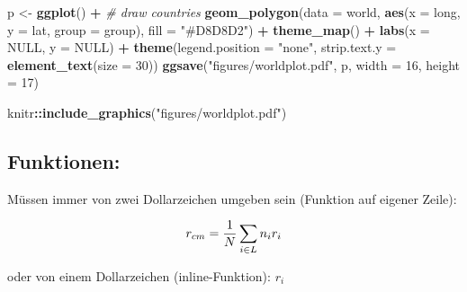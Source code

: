 \documentclass[
  11pt,
]{article}
\newenvironment{Shaded}{\begin{snugshade}}{\end{snugshade}}
\newcommand{\CommentTok}[1]{\textcolor[rgb]{0.56,0.35,0.01}{\textit{#1}}}
\newcommand{\DataTypeTok}[1]{\textcolor[rgb]{0.13,0.29,0.53}{#1}}
\newcommand{\DecValTok}[1]{\textcolor[rgb]{0.00,0.00,0.81}{#1}}
\newcommand{\KeywordTok}[1]{\textcolor[rgb]{0.13,0.29,0.53}{\textbf{#1}}}
\newcommand{\NormalTok}[1]{#1}
\newcommand{\OperatorTok}[1]{\textcolor[rgb]{0.81,0.36,0.00}{\textbf{#1}}}
\newcommand{\OtherTok}[1]{\textcolor[rgb]{0.56,0.35,0.01}{#1}}
\newcommand{\StringTok}[1]{\textcolor[rgb]{0.31,0.60,0.02}{#1}}
\begin{document}
\small

\linespread{1}

\begin{Shaded}
\begin{Highlighting}[]
\NormalTok{p \textless{}{-}}\StringTok{ }\KeywordTok{ggplot}\NormalTok{() }\OperatorTok{+}\StringTok{ }
\StringTok{  }\CommentTok{\# draw countries}
\StringTok{  }\KeywordTok{geom\_polygon}\NormalTok{(}\DataTypeTok{data =}\NormalTok{ world, }\KeywordTok{aes}\NormalTok{(}\DataTypeTok{x =}\NormalTok{ long, }
                                       \DataTypeTok{y =}\NormalTok{ lat, }
                                       \DataTypeTok{group =}\NormalTok{ group), }
                 \DataTypeTok{fill =} \StringTok{"\#D8D8D2"}\NormalTok{) }\OperatorTok{+}
\StringTok{  }\KeywordTok{theme\_map}\NormalTok{() }\OperatorTok{+}
\StringTok{  }\KeywordTok{labs}\NormalTok{(}\DataTypeTok{x =} \OtherTok{NULL}\NormalTok{,}
       \DataTypeTok{y =} \OtherTok{NULL}\NormalTok{) }\OperatorTok{+}
\StringTok{  }\KeywordTok{theme}\NormalTok{(}\DataTypeTok{legend.position =} \StringTok{"none"}\NormalTok{,}
        \DataTypeTok{strip.text.y =} \KeywordTok{element\_text}\NormalTok{(}\DataTypeTok{size =} \DecValTok{30}\NormalTok{))}
\KeywordTok{ggsave}\NormalTok{(}\StringTok{"figures/worldplot.pdf"}\NormalTok{, p, }\DataTypeTok{width =} \DecValTok{16}\NormalTok{, }\DataTypeTok{height =} \DecValTok{17}\NormalTok{)}
\end{Highlighting}
\end{Shaded}

\linespread{1.5}

\normalsize

\small

\linespread{1}

\begin{Shaded}
\begin{Highlighting}[]
\NormalTok{knitr}\OperatorTok{::}\KeywordTok{include\_graphics}\NormalTok{(}\StringTok{"figures/worldplot.pdf"}\NormalTok{)}
\end{Highlighting}
\end{Shaded}

\linespread{1.5}

\normalsize

\hypertarget{funktionen}{%
\subsection{Funktionen:}\label{funktionen}}

Müssen immer von zwei Dollarzeichen umgeben sein (Funktion auf eigener Zeile):

\[r_{cm} = {1 \over N} \sum_{i \in L} n_{i}r_{i}\]

oder von einem Dollarzeichen (inline-Funktion): \(r_{i}\)
\end{document}
